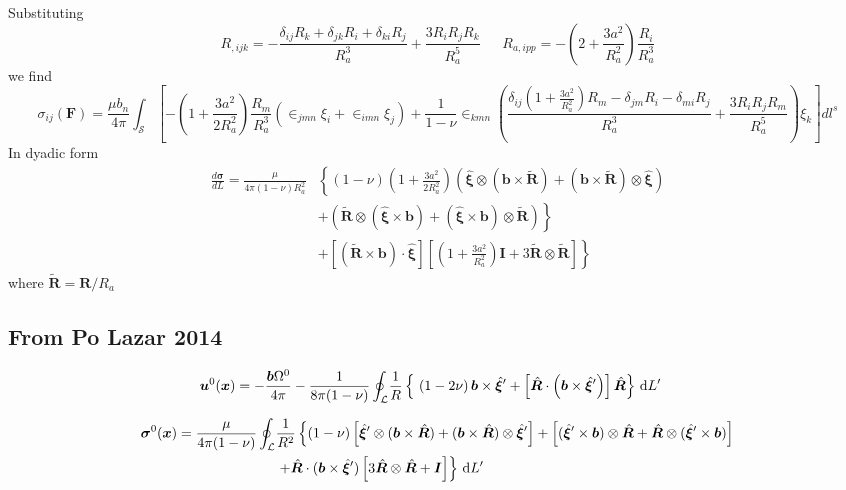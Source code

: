 \documentclass[10pt]{report}
\begin{document}
{Substituting 
\begin{equation}
R_{,ijk}=-\frac{\delta_{ij}R_k+\delta_{jk}R_i+\delta_{ki}R_j}{R_a^3}+\frac{3R_iR_jR_k}{R_a^5} \ \ \ \ \ \ \    R_{a,ipp}=-\left(2+\frac{3a^2}{R_a^2}\right)\frac{R_i}{R_a^3}
\end{equation}
we find
\begin{equation}
\sigma_{ij}(\bm F)=\frac{\mu b_n}{4\pi}\int_\mathcal{S} \left[-\left(1+\frac{3a^2}{2R_a^2}\right)\frac{R_m}{R_a^3}\left(\in_{jmn}\xi_i+\in_{imn}\xi_j\right)+\frac{1}{1-\nu}\in_{kmn}\left(\frac{\delta_{ij}\left(1+\frac{3a^2}{R_a^2}\right)R_m-\delta_{jm}R_i-\delta_{mi}R_j}{R_a^3}+\frac{3R_iR_jR_m}{R_a^5}\right)\xi_k\right]dl^s
\end{equation}
In dyadic form
\begin{align}
\frac{d\bm \sigma}{d L}=\frac{\mu }{4\pi (1-\nu)R_a^2}&\left\{(1-\nu)\left(1+\frac{3a^2}{2R_a^2}\right)\left(\hat{\bm\xi}\otimes (\bm b\times \tilde{\bm R})+ (\bm b\times \tilde{\bm R})\otimes\hat{\bm\xi}\right)\right.\nonumber\\
&\left.+\left(\tilde{\bm R}\otimes(\hat{\bm\xi}\times\bm b)+(\hat{\bm\xi}\times\bm b)\otimes \tilde{\bm R}\right)\right\}\nonumber\\
%
&\left.+[(\tilde{\bm R}\times\bm b)\cdot\hat{\bm \xi}]\left[\left(1+\frac{3a^2}{R_a^2}\right)\bm I+3\tilde{\bm R}\otimes \tilde {\bm R}\right]\right\}
\end{align}
where $\tilde{\bm R}=\bm R/R_a$

\subsection{From Po Lazar 2014}

\begin{align}
 \bm u^0(\bm x)=-\frac{\bm b\Omega^0}{4\pi}-\frac{1}{8\pi(1-\nu)}\oint_\mathcal{L}&\frac{1}{R}\left\{\ 
 \left(1-2\nu\right) \bm b\times\hat{\bm \xi}'
+ \left[\hat{\bm R}\cdot\left(\bm b\times\hat{\bm \xi}' \right) \right]\hat{\bm R}  \right\}\dL'
\end{align}


\begin{align}
\bm\sigma^0(\bm x)=\frac{\mu}{4\pi(1-\nu)}\oint_{\mathcal{L}}&\frac{1}{R^2}\left\{
(1-\nu)\left[\hat{\bm\xi}'\otimes(\bm b\times\hat{\bm R})+(\bm b\times\hat{\bm R})\otimes\hat{\bm\xi}'\right] 
+\left[(\hat{\bm \xi}'\times\bm b)\otimes\hat{\bm R}+\hat{\bm R}\otimes(\hat{\bm \xi}'\times\bm b)\right] \right. \nonumber\\
&\left.+\hat{\bm R}\cdot(\bm b\times\hat{\bm\xi}')\left[3\hat{\bm R}\otimes\hat{\bm R}+\bm I \right]
\right\}\, \text{d}L'
\end{align}


}
\end{document}
